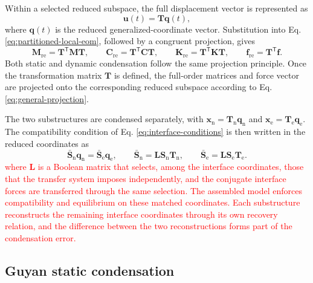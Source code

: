 \documentclass[11pt,a4paper]{article}
\numberwithin{equation}{section}
\newcommand{\rev}[1]{\textcolor{red}{#1}}
\begin{document}
Within a selected reduced subspace, the full displacement vector is represented as
\begin{equation}
	\bm{u}(t)=\mathbf{T}\bm{q}(t),
	\label{eq:general-reduction}
\end{equation}
where \(\bm{q}(t)\) is the reduced generalized-coordinate vector. Substitution into Eq. \eqref{eq:partitioned-local-eom}, followed by a congruent projection, gives
\begin{equation}
	\mathbf{M}_{\mathrm{re}}=\mathbf{T}^{\mathsf{T}}\mathbf{M}\mathbf{T},
	\qquad
	\mathbf{C}_{\mathrm{re}}=\mathbf{T}^{\mathsf{T}}\mathbf{C}\mathbf{T},
	\qquad
	\mathbf{K}_{\mathrm{re}}=\mathbf{T}^{\mathsf{T}}\mathbf{K}\mathbf{T},
	\qquad
	\bm{f}_{\mathrm{re}}=\mathbf{T}^{\mathsf{T}}\bm{f}.
	\label{eq:general-projection}
\end{equation}
Both static and dynamic condensation follow the same projection principle. Once the transformation matrix \(\mathbf{T}\) is defined, the full-order matrices and force vector are projected onto the corresponding reduced subspace according to Eq. \eqref{eq:general-projection}.

The two substructures are condensed separately, with \(\bm{x}_{\mathrm{n}}=\mathbf{T}_{\mathrm{n}}\bm{q}_{\mathrm{n}}\) and \(\bm{x}_{\mathrm{e}}=\mathbf{T}_{\mathrm{e}}\bm{q}_{\mathrm{e}}\). The compatibility condition of Eq. \eqref{eq:interface-conditions} is then written in the reduced coordinates as
\begin{equation}
	\bar{\mathbf{S}}_{\mathrm{n}}\bm{q}_{\mathrm{n}}
	=\bar{\mathbf{S}}_{\mathrm{e}}\bm{q}_{\mathrm{e}},
	\qquad
	\bar{\mathbf{S}}_{\mathrm{n}}=\mathbf{L}\mathbf{S}_{\mathrm{n}}\mathbf{T}_{\mathrm{n}},
		\qquad
		\bar{\mathbf{S}}_{\mathrm{e}}=\mathbf{L}\mathbf{S}_{\mathrm{e}}\mathbf{T}_{\mathrm{e}}.
	\label{eq:reduced-interface}
\end{equation}
\rev{where \(\mathbf{L}\) is a Boolean matrix that selects, among the interface coordinates, those that the transfer system imposes independently, and the conjugate interface forces are transferred through the same selection. The assembled model enforces compatibility and equilibrium on these matched coordinates. Each substructure reconstructs the remaining interface coordinates through its own recovery relation, and the difference between the two reconstructions forms part of the condensation error.}




\subsection{Guyan static condensation} \label{sec21}
\end{document}
